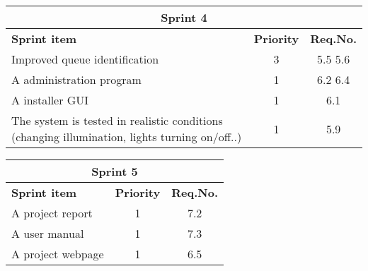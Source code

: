 \label{sprint4}
\begin{center}
	\begin{Large}
	\begin{tabular}{|p{10.5cm}|c|c|}
		\hline
		\multicolumn{3}{|c|}{\textbf{Sprint 4}} \\
		\hline
		\large{\textbf{Sprint item}} & \large{\textbf{Priority}} & \large{\textbf{Req.No.}} \\
		\hline
		\large{Improved queue identification} & \large{3} & 5.5 5.6 \\
		\hline
		\large{A administration program} & \large{1} & 6.2 6.4 \\
		\hline
		\large{A installer GUI} & \large{1} & 6.1 \\
		\hline
		\large{The system is tested in realistic conditions (changing illumination, lights turning on/off..)} & \large{1} & 5.9 \\
		\hline
	\end{tabular}
	\end{Large}
\end{center}



\label{sprint5}
\begin{center}
	\begin{Large}
	\begin{tabular}{|p{10.5cm}|c|c|}
		\hline
		\multicolumn{3}{|c|}{\textbf{Sprint 5}} \\
		\hline
		\large{\textbf{Sprint item}} & \large{\textbf{Priority}} & \large{\textbf{Req.No.}} \\
		\hline
		\large{A project report} & \large{1} & 7.2 \\
		\hline
		\large{A user manual} & \large{1} & 7.3 \\
		\hline
		\large{A project webpage} & \large{1} & 6.5 \\
		\hline
	\end{tabular}
	\end{Large}
\end{center}